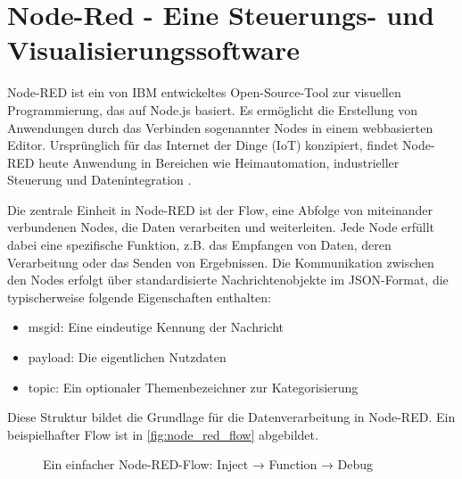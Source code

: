 \section{Node-Red - Eine Steuerungs- und Visualisierungssoftware}
\label{sec:mes}

Node-RED ist ein von IBM entwickeltes Open-Source-Tool zur visuellen Programmierung, das auf Node.js basiert. Es ermöglicht die Erstellung von Anwendungen durch das Verbinden sogenannter Nodes in einem webbasierten Editor. Ursprünglich für das Internet der Dinge (IoT) konzipiert, findet Node-RED heute Anwendung in Bereichen wie Heimautomation, industrieller Steuerung und Datenintegration \autocite{nodered_official}. 

Die zentrale Einheit in Node-RED ist der Flow, eine Abfolge von miteinander verbundenen Nodes, die Daten verarbeiten und weiterleiten. Jede Node erfüllt dabei eine spezifische Funktion, z.B. das Empfangen von Daten, deren Verarbeitung oder das Senden von Ergebnissen. Die Kommunikation zwischen den Nodes erfolgt über standardisierte Nachrichtenobjekte im JSON-Format, die typischerweise folgende Eigenschaften enthalten:

\begin{itemize}
	
	\item msgid: Eine eindeutige Kennung der Nachricht
	
	\item payload: Die eigentlichen Nutzdaten
	
	\item topic: Ein optionaler Themenbezeichner zur Kategorisierung	

\end{itemize}

Diese Struktur bildet die Grundlage für die Datenverarbeitung in Node-RED. Ein beispielhafter Flow ist in \autoref{fig:node_red_flow} abgebildet.

\begin{figure}[H]
	\centering
	\caption{Ein einfacher Node-RED-Flow: Inject → Function → Debug}
	\label{fig:node_red_flow}
\end{figure}

